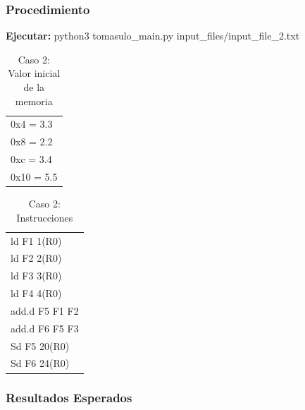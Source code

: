 \documentclass[a4paper]{article}
\begin{document}
	\subsubsection*{Procedimiento}

	\textbf{Ejecutar:} python3 tomasulo\_main.py input\_files/input\_file\_2.txt

	\begin{table}[H]
		\centering
		\caption*{Caso 2: Valor inicial de la memoria}
		\begin{tabular}{l}
			0x4 = 3.3 \\
			0x8 = 2.2 \\
			0xc = 3.4 \\
			0x10 = 5.5			
		\end{tabular}
	\end{table}

	\begin{table}[H]
		\centering
		\caption*{Caso 2: Instrucciones}
		\begin{tabular}{l}
			ld F1 1(R0) \\
			ld F2 2(R0) \\
			ld F3 3(R0) \\
			ld F4 4(R0) \\
			add.d F5 F1 F2 \\
			add.d F6 F5 F3 \\
			Sd F5 20(R0) \\
			Sd F6 24(R0)
		\end{tabular}
	\end{table}

	\subsubsection*{Resultados Esperados}
\end{document}
